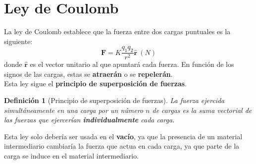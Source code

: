 \documentclass{article}
\newtheorem*{superposición*}{Definición}
\begin{document}
\section*{Ley de Coulomb}
La ley de Coulomb establece que la fuerza entre dos cargas puntuales es la siguiente:
\[
    \mathbf{F}=K \frac{q_1 q_2}{r^2}\hat{\mathbf{r}}\:(N)
\]
donde $\hat{\mathbf{r}}$ es el vector unitario al que apuntará cada fuerza. En función de los signos de las cargas, estas se \textbf{atraerán} o se
\textbf{repelerán}.\\
Esta ley sigue el \textbf{principio de superposición de fuerzas}.
\begin{superposición*}[Principio de superposición de fuerzas]
    La fuerza ejercida simultáneamente en una carga por un número $n$ de cargas es la suma vectorial de las fuerzas que ejercerían
    \textbf{individualmente} cada carga.
\end{superposición*}
Esta ley solo debería ser usada en el \textbf{vacío}, ya que la presencia de un material intermediario cambiaría la fuerza que actua en
cada carga, ya que parte de la carga se induce en el material intermediario.
\end{document}
